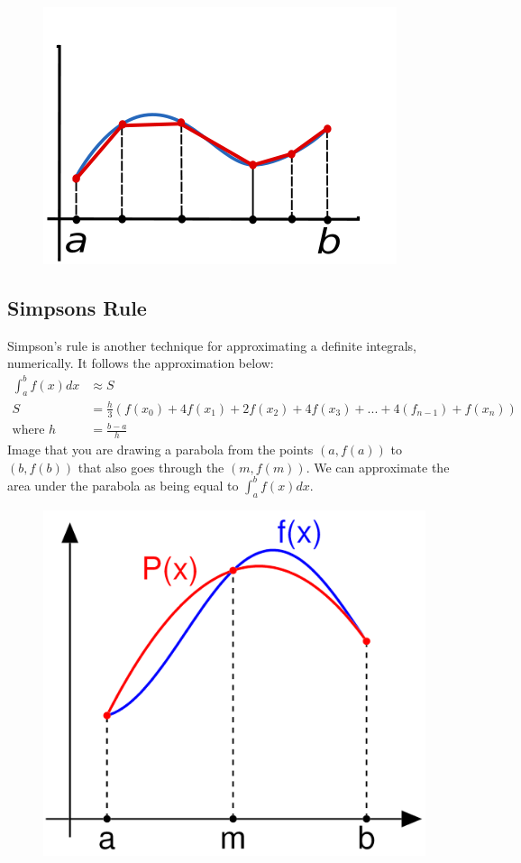 \documentclass[
]{article}
\begin{document}
\begin{figure}[h!]\centering 
\includegraphics[width=0.6\linewidth]{trapezoidal_rule_illustration.png} 
\end{figure}

\subsection*{Simpsons Rule}

Simpson's rule is another technique for approximating a definite
integrals, numerically. It follows the approximation below:
\begin{align*} 
 \int_a^b f(x) dx &\approx S\\
S &= \frac{h}{3}(f(x_0) + 4f(x_1) + 2f(x_2) + 4f(x_3) +  ... + 4(f_{n-1}) + f(x_n))\\
\text{where } h &= \frac{b-a}{h} 
\end{align*} Image that you are drawing a parabola from the points
\((a, f(a))\) to \((b, f(b))\) that also goes through the \((m, f(m))\).
We can approximate the area under the parabola as being equal to
\(\int_a^b f(x) dx\).

\begin{figure}[h!]\centering 
\includegraphics[width=0.6\linewidth]{Simpsons_method_illustration.png} 
\end{figure}
\end{document}
